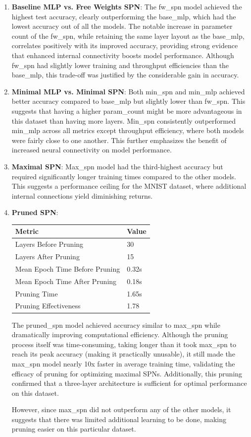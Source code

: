 \begin{enumerate}
\item \textbf{Baseline MLP vs. Free Weights SPN}: The fw\_spn model achieved the highest test accuracy, clearly outperforming the base\_mlp, which had the lowest accuracy out of all the models. The notable increase in parameter count of the fw\_spn, while retaining the same layer layout as the base\_mlp, correlates positively with its improved accuracy, providing strong evidence that enhanced internal connectivity boosts model performance. Although fw\_spn had slightly lower training and throughput efficiencies than the base\_mlp, this trade-off was justified by the considerable gain in accuracy.
\item \textbf{Minimal MLP vs. Minimal SPN}: Both min\_spn and min\_mlp achieved better accuracy compared to base\_mlp but slightly lower than fw\_spn. This suggests that having a higher param\_count might be more advantageous in this dataset than having more layers. Min\_spn consistently outperformed min\_mlp across all metrics except throughput efficiency, where both models were fairly close to one another. This further emphasizes the benefit of increased neural connectivity on model performance.
\item \textbf{Maximal SPN}: Max\_spn model had the third-highest accuracy but required significantly longer training times compared to the other models. This suggests a performance ceiling for the MNIST dataset, where additional internal connections yield diminishing returns.
\item \textbf{Pruned SPN}:
\begin{center}  %
\begin{tabular}{|l|l|}
\hline
\textbf{Metric} & \textbf{Value} \\
\hline
Layers Before Pruning & 30 \\
Layers After Pruning & 15 \\
Mean Epoch Time Before Pruning & 0.32s \\
Mean Epoch Time After Pruning & 0.18s \\
Pruning Time & 1.65s \\
Pruning Effectiveness & 1.78 \\
\hline
\end{tabular}
\end{center}
The pruned\_spn model achieved accuracy similar to max\_spn while dramatically improving computational efficiency. Although the pruning process itself was time-consuming, taking longer than it took max\_spn to reach its peak accuracy (making it practically unusable), it still made the max\_spn model nearly 10x faster in average training time, validating the efficacy of pruning for optimizing maximal SPNs. Additionally, this pruning confirmed that a three-layer architecture is sufficient for optimal performance on this dataset. 

However, since max\_spn did not outperform any of the other models, it suggests that there was limited additional learning to be done, making pruning easier on this particular dataset.
\end{enumerate}

